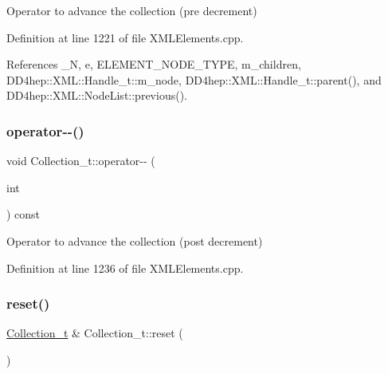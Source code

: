 Operator to advance the collection (pre decrement) 



Definition at line 1221 of file X\+M\+L\+Elements.\+cpp.



References \+\_\+N, e, E\+L\+E\+M\+E\+N\+T\+\_\+\+N\+O\+D\+E\+\_\+\+T\+Y\+PE, m\+\_\+children, D\+D4hep\+::\+X\+M\+L\+::\+Handle\+\_\+t\+::m\+\_\+node, D\+D4hep\+::\+X\+M\+L\+::\+Handle\+\_\+t\+::parent(), and D\+D4hep\+::\+X\+M\+L\+::\+Node\+List\+::previous().

\hypertarget{class_d_d4hep_1_1_x_m_l_1_1_collection__t_a4521013ebd56ddec60ece3e8a5bb0192}{}\label{class_d_d4hep_1_1_x_m_l_1_1_collection__t_a4521013ebd56ddec60ece3e8a5bb0192} 
\subsubsection{\texorpdfstring{operator-\/-\/()}{operator--()}\hspace{0.1cm}{\footnotesize\ttfamily [2/2]}}
{\footnotesize\ttfamily void Collection\+\_\+t\+::operator-\/-\/ (\begin{DoxyParamCaption}\item[{int}]{ }\end{DoxyParamCaption}) const}



Operator to advance the collection (post decrement) 



Definition at line 1236 of file X\+M\+L\+Elements.\+cpp.

\hypertarget{class_d_d4hep_1_1_x_m_l_1_1_collection__t_adeb2667661d9b30037d28e6045068b00}{}\label{class_d_d4hep_1_1_x_m_l_1_1_collection__t_adeb2667661d9b30037d28e6045068b00} 
\subsubsection{\texorpdfstring{reset()}{reset()}}
{\footnotesize\ttfamily \hyperlink{class_d_d4hep_1_1_x_m_l_1_1_collection__t}{Collection\+\_\+t} \& Collection\+\_\+t\+::reset (\begin{DoxyParamCaption}{ }\end{DoxyParamCaption})}



